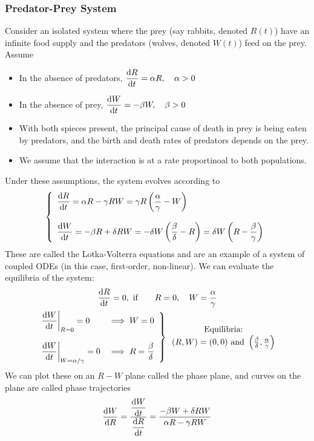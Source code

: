 \documentclass{report}
\begin{document}
\subsubsection*{Predator-Prey System}
Consider an isolated system where the prey (say rabbits, denoted $R(t)$) have an infinite food supply and the predators (wolves, denoted $W(t)$) feed on the prey. Assume
\begin{itemize}
	\item In the absence of predators, $\dps{\dyd[R]{t} = \alpha R,\quad \alpha > 0}$
	\item In the absence of prey, $\dps{\dyd[W]{t} = -\beta W,\quad \beta > 0}$
	\item With both spieces present, the principal cause of death in prey is being eaten by predators, and the birth and death rates of predators depends on the prey.
	\item We assume that the interaction is at a rate proportinoal to both populations.
\end{itemize}
Under these assumptions, the system evolves according to 
$$
	\left\lbrace \begin{array}{l}
		\dps{\dyd[R]{t} = \alpha R - \gamma RW = \gamma R\bracks{\frac{\alpha}{\gamma} - W}} \\ \\
		\dps{\dyd[W]{t} = -\beta R + \delta RW = -\delta W\bracks{\frac{\beta}{\delta} - R} = \delta W \bracks{R - \frac{\beta}{\gamma}}}
	\end{array} \right.
$$
These are called the Lotka-Volterra equations and are an example of a system of coupled ODEs (in this case, first-order, non-linear). We can evaluate the equilibria of the system:
\begin{gather*}
	\dyd[R]{t} = 0,\text{ if}\qquad R = 0,\quad W = \frac{\alpha}{\gamma} \\
	\left.\begin{array}{ll}
		\dps{\left.\dyd[W]{t}\right|_{R=0} = 0} & \dps{\implies W = 0} \\ \\
		\dps{\left.\dyd[W]{t}\right|_{W=\alpha/\gamma} = 0} & \dps{\implies R = \frac{\beta}{\delta}}
	\end{array}\right\rbrace \begin{array}{c} \text{Equilibria:} \\ (R,W) = (0,0) \text{ and } \bracks{\frac{\beta}{\delta}, \frac{\alpha}{\gamma}} \end{array}
\end{gather*}
We can plot these on an $R{-}W$ plane called the phase plane, and curves on the plane are called phase trajectories
$$
	\dyd[W]{R} = \dfrac{\dps{\dyd[W]{t}}}{\dps{\dyd[R]{t}}} = \frac{-\beta W + \delta RW}{\alpha R - \gamma RW}
$$
\end{document}
